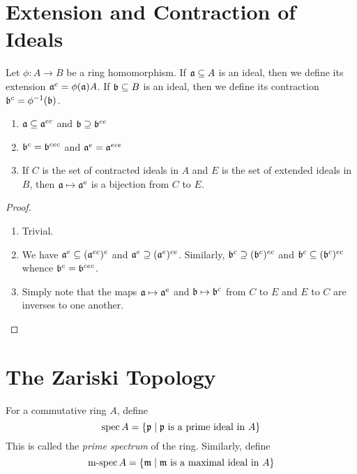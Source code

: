 \section{Extension and Contraction of Ideals}

\begin{definition}
    Let $\phi: A\to B$ be a ring homomorphism. If $\mathfrak a\subseteq A$ is an ideal, then we define its extension $\mathfrak a^e = \phi(\mathfrak a)A$. If $\mathfrak b\subseteq B$ is an ideal, then we define its contraction $\mathfrak b^c = \phi^{-1}(\mathfrak b)$.
\end{definition}

\begin{proposition}
    \begin{enumerate}[label=(\alph*)]
        \item $\mathfrak a\subseteq\mathfrak a^{ec}$ and $\mathfrak b\supseteq\mathfrak b^{ce}$ 
        \item $\mathfrak b^c = \mathfrak b^{cec}$ and $\mathfrak a^{e} = \mathfrak a^{ece}$
        \item If $C$ is the set of contracted ideals in $A$ and $E$ is the set of extended ideals in $B$, then $\mathfrak a\mapsto\mathfrak a^e$ is a bijection from $C$ to $E$.
    \end{enumerate}
\end{proposition}
\begin{proof}
\begin{enumerate}[label=(\alph*)]
    \item Trivial.
    \item We have $\mathfrak a^{e}\subseteq(\mathfrak a^{ec})^e$ and $\mathfrak a^e\supseteq(\mathfrak a^e)^{ce}$. Similarly, $\mathfrak b^c\supseteq (\mathfrak b^c)^{ec}$ and $\mathfrak b^{c}\subseteq(\mathfrak b^{c})^{ec}$ whence $\mathfrak b^c = \mathfrak b^{cec}$.
    \item Simply note that the maps $\mathfrak a\mapsto\mathfrak a^e$ and $\mathfrak b\mapsto\mathfrak b^c$ from $C$ to $E$ and $E$ to $C$ are inverses to one another.
\end{enumerate}
\end{proof}

\section{The Zariski Topology}

\begin{definition}
    For a commutative ring $A$, define 
    \begin{equation*}
        \operatorname{spec} A = \{\mathfrak p\mid\mathfrak p\text{ is a prime ideal in }A\}
    \end{equation*}
    This is called the \textit{prime spectrum} of the ring. Similarly, define 
    \begin{equation*}
        \operatorname{m-spec} A = \{\mathfrak m\mid\mathfrak m\text{ is a maximal ideal in } A\}
    \end{equation*}
\end{definition}


